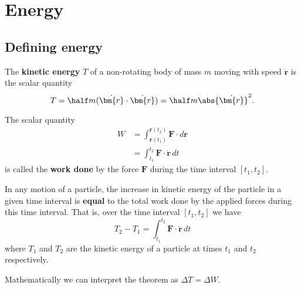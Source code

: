 \documentclass[12pt, a4paper]{article}
\begin{document}
\section{Energy}

\subsection{Defining energy}

\begin{definition}
    The \textbf{kinetic energy} \(T\) of a non-rotating body of mass \(m\) moving with speed \(\bm{\dot{r}}\) is the scalar quantity
    \[T=\half m (\dot{\bm{r}} \cdot \dot{\bm{r}}) = \half m \abs{\dot{\bm{r}}}^2.\]
\end{definition}

\begin{definition}
    The scalar quantity
    \[\begin{aligned}
        W &= \int_{\bm{r}(t_1)}^{\bm{r}(t_2)} \bm{F} \cdot d\bm{r} \\
         &= \int_{t_1}^{t_2} \bm{F} \cdot \dot{\bm{r}} \, dt
    \end{aligned}\]
    is called the \textbf{work done} by the force \(\bm{F}\) during the time interval \([t_1,t_2]\).
\end{definition}

\begin{mdthm}
    In any motion of a particle, the increase in kinetic energy of the particle in a given time interval is \textbf{equal} to the total work done by the applied forces during this time interval. That is, over the time interval \([t_1,t_2]\) we have
    \[T_2-T_1 = \int_{t_1}^{t_2} \bm{F} \cdot \dot{\bm{r}} \, dt\]
    where \(T_1\) and \(T_2\) are the kinetic energy of a particle at times \(t_1\) and \(t_2\) respectively.
\end{mdthm}

\begin{mdnote}
    Mathematically we can interpret the theorem as \(\Delta T =\Delta W\).
\end{mdnote}
\end{document}
